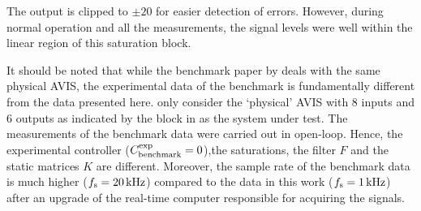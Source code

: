 The output  is clipped to $\pm 20$ for easier detection of errors.
However, during normal operation and all the measurements, the signal levels were well within the linear region of this saturation block.

\begin{remark}
It should be noted that while the benchmark paper by \citet{Voorhoeve2015SYSID} deals with the same physical \gls{AVIS}, the experimental data of the benchmark is fundamentally different from the data presented here.
 only consider the `physical' \gls{AVIS} with $8$ inputs and $6$ outputs as indicated by the  block in  as the system under test.
The measurements of the benchmark data were carried out in open-loop.
Hence, the experimental controller ($C^{\mathrm{exp}}_{\mathrm{benchmark}} = 0$),the saturations, the filter $F$ and the static matrices $K$ are different.
Moreover, the sample rate of the benchmark data is much higher ($f_{\mathrm{s}}  = 20 \,\mathrm{kHz}$) compared to the data in this work ($f_{\mathrm{s}} = 1\,\mathrm{kHz}$) after an upgrade of the real-time computer responsible for acquiring the signals.
\end{remark}

